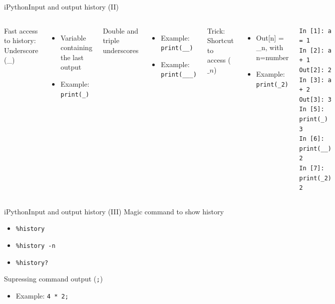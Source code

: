 \documentclass[10pt,compress]{beamer} %
\begin{document}
\begin{frame}[fragile]{iPython}{Input and output history (II)}
	\begin{columns}

	Fast access to history: Underscore (\_)
	\begin{itemize}
		\item Variable containing the last output
		\item Example: \texttt{print(\_)}
	\end{itemize}
	Double and triple underscores
	\begin{itemize}
		\item Example: \texttt{print(\_\_)}
		\item Example: \texttt{print(\_\_\_)}
	\end{itemize}
	Trick: Shortcut to access ($\_n$)
	\begin{itemize}
		\item Out[n] = \_n, with n=number
		\item Example: \texttt{print(\_2)}
	\end{itemize}

\footnotesize{
	\begin{exampleblock}{}
	   \vspace{-0.2cm}
		\begin{verbatim}
In [1]: a = 1
In [2]: a + 1
Out[2]: 2
In [3]: a + 2
Out[3]: 3
In [5]: print(_)
3
In [6]: print(__)
2
In [7]: print(_2)
2
\end{verbatim}
	   \vspace{-0.2cm}
	\end{exampleblock}
}
\end{columns}
\end{frame}

\begin{frame}{iPython}{Input and output history (III)}
	Magic command to show history
		\begin{itemize}
		\item \texttt{\%history}
		\item \texttt{\%history -n}
		\item \texttt{\%history?}
		\end{itemize}
	Supressing command output (\texttt{;})
		\begin{itemize}
		\item Example: \texttt{4 * 2;}
		\end{itemize}
\end{frame}
\end{document}
